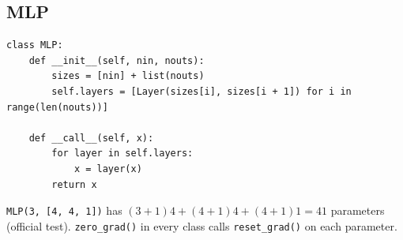 \documentclass[11pt,a4paper]{article}
\begin{document}
\subsection{MLP}
\begin{lstlisting}
class MLP:
    def __init__(self, nin, nouts):
        sizes = [nin] + list(nouts)
        self.layers = [Layer(sizes[i], sizes[i + 1]) for i in range(len(nouts))]

    def __call__(self, x):
        for layer in self.layers:
            x = layer(x)
        return x
\end{lstlisting}
\texttt{MLP(3, [4, 4, 1])} has $(3{+}1)4 + (4{+}1)4 + (4{+}1)1 = 41$ parameters (official test).
\texttt{zero\_grad()} in every class calls \texttt{reset\_grad()} on each parameter.

\end{document}
